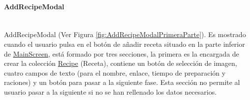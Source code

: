 \documentclass[twoside, openright, 11pt]{report}
\begin{document}
				\paragraph{AddRecipeModal\\\\}\label{AddRecipeModal}
					AddRecipeModal (Ver Figura \ref{fig:AddRecipeModalPrimeraParte}). Es mostrado cuando el usuario pulsa en el botón de añadir receta situado en la parte inferior de  \hyperref[MainScreen]{MainScreen}, está formado por tres secciones, la primera es la encargada de crear la colección \hyperref[Recipe]{Recipe} (Receta), contiene un botón de selección de imagen, cuatro campos de texto (para el nombre, enlace, tiempo de preparación y raciones) y un botón para pasar a la siguiente fase. Esta sección no permite al usuario pasar a la siguiente si no se han rellenado los datos necesarios. 
						
\end{document}
